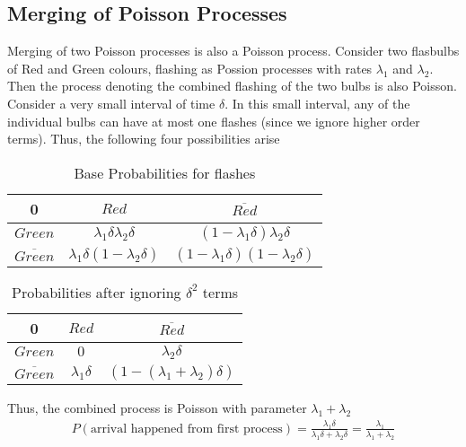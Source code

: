 \documentclass[11pt, a4paper]{article}
\begin{document}
    \subsection{Merging of Poisson Processes}
    Merging of two Poisson processes is also a Poisson process. Consider two flasbulbs of Red and Green colours, flashing as Possion processes with rates $\lambda_{1}$ and $\lambda_{2}$. Then the process denoting the combined flashing of the two bulbs is also Poisson.\newline
    Consider a very small interval of time $\delta$. In this small interval, any of the individual bulbs can have at most one flashes (since we ignore higher order terms). Thus, the following four possibilities arise \newline
    \begin{table}[h]
    \centering
    \begin{tabular}{c|c|c}
        0 & $Red$ & $\overline{Red}$\\ \hline
        $Green$ & $\lambda_{1} \delta \lambda_{2} \delta $ & $(1-\lambda_{1}\delta)  \lambda_{2} \delta$\\ \hline
        $\overline{Green}$ & $\lambda_{1} \delta (1-\lambda_{2}\delta) $ & $(1-\lambda_{1}\delta) (1-\lambda_{2}\delta)$ \\
    \end{tabular}
    \caption{Base Probabilities for flashes}
    \end{table}
    \begin{table}[h]
    \centering
    \begin{tabular}{c|c|c}
        0 & $Red$ & $\overline{Red}$\\ \hline
        $Green$ & $0$ & $ \lambda_{2} \delta$\\ \hline
        $\overline{Green}$ & $\lambda_{1} \delta$ & $(1-(\lambda_{1} + \lambda_{2}) \delta)$ \\
    \end{tabular}
    \caption{Probabilities after ignoring $\delta^{2}$ terms}
    \end{table}

    Thus, the combined process is Poisson with parameter $\lambda_{1} + \lambda_{2}$ \newline
    \begin{align*}
    P(\text{arrival happened from first process}) = \frac{\lambda_{1} \delta}{\lambda_{1} \delta + \lambda_2 \delta} = \frac{\lambda_{1}}{\lambda_{1} + \lambda_{2}}
    \end{align*}
\end{document}
